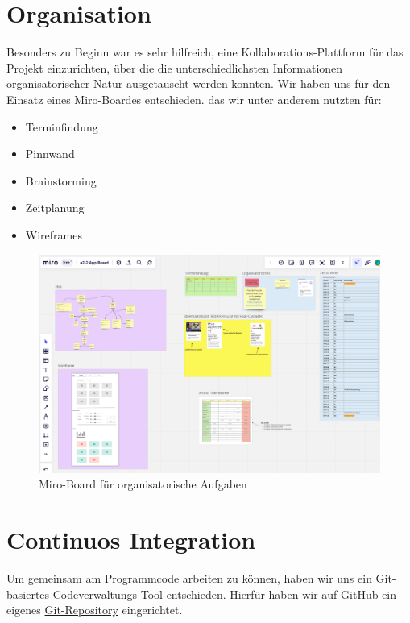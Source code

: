 \documentclass{article}
\begin{document}
\section{Organisation}

Besonders zu Beginn war es sehr hilfreich, eine Kollaborations-Plattform 
für das Projekt einzurichten, über die die unterschiedlichsten Informationen
organisatorischer Natur ausgetauscht werden konnten. 
Wir haben uns für den Einsatz eines Miro-Boardes entschieden. das wir 
unter anderem nutzten für:

\begin{itemize}
\item Terminfindung
\item Pinnwand
\item Brainstorming
\item Zeitplanung
\item Wireframes
\end{itemize}

\begin{figure}[ht]
	\begin{center}
 	\includegraphics[scale=0.25]{../images/miro_board.png}
 	\caption{Miro-Board für organisatorische Aufgaben}
	\end{center}
\end{figure}

\section{Continuos Integration}

Um gemeinsam am Programmcode arbeiten zu können, haben wir uns ein Git-basiertes 
Codeverwaltungs-Tool entschieden. Hierfür haben wir auf GitHub ein eigenes
\href{https://github.com/jk-fhswf/pki-a22-app}{Git-Repository} eingerichtet.
\end{document}
